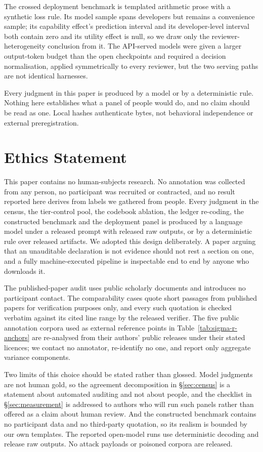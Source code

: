 \documentclass[11pt]{article}
\begin{document}
The crossed deployment benchmark is templated arithmetic prose with a synthetic
loss rule. Its model sample spans \CMJdevelopers{} developers but remains a
convenience sample; its capability effect's prediction interval and its
developer-level interval both contain zero and its utility effect is null, so we
draw only the reviewer-heterogeneity conclusion from it. The API-served models
were given a larger output-token budget than the open checkpoints and required a
decision normalisation, applied symmetrically to every reviewer, but the two
serving paths are not identical harnesses.

Every judgment in this paper is produced by a model or by a deterministic rule.
Nothing here establishes what a panel of people would do, and no claim should be
read as one. Local hashes authenticate bytes, not behavioral independence or
external preregistration.

\section*{Ethics Statement}

This paper contains no human-subjects research. No annotation was collected from
any person, no participant was recruited or contracted, and no result reported
here derives from labels we gathered from people. Every judgment in the census,
the tier-control pool, the codebook ablation, the ledger re-coding, the
constructed benchmark and the deployment panel is produced by a language model
under a released prompt with released raw outputs, or by a deterministic rule
over released artifacts. We adopted this design deliberately. A paper arguing
that an unauditable declaration is not evidence should not rest a section on
one, and a fully machine-executed pipeline is inspectable end to end by anyone
who downloads it.

The published-paper audit uses public scholarly documents and introduces no
participant contact. The comparability cases quote short passages from published
papers for verification purposes only, and every such quotation is checked
verbatim against its cited line range by the released verifier. The five public
annotation corpora used as external reference points in
Table~\ref{tab:sigma-r-anchors} are re-analysed from their authors' public
releases under their stated licences; we contact no annotator, re-identify no
one, and report only aggregate variance components.

Two limits of this choice should be stated rather than glossed. Model judgments
are not human gold, so the agreement decomposition in \S\ref{sec:census} is a
statement about automated auditing and not about people, and the checklist in
\S\ref{sec:measurement} is addressed to authors who will run such panels rather
than offered as a claim about human review. And the constructed benchmark
contains no participant data and no third-party quotation, so its realism is
bounded by our own templates. The reported open-model runs use deterministic
decoding and release raw outputs. No attack payloads or poisoned corpora are
released.
\end{document}
